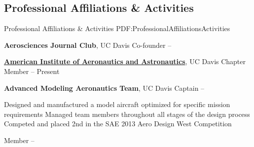 \documentclass[letterpaper,MMMyyyy,nonstop]{simpleresumecv}
\begin{document}
\begin{body}





\section
{Professional Affiliations\newline
\& Activities}
{Professional Affiliations \& Activities}
{PDF:ProfessionalAffiliationsActivities}

\textbf{Aerosciences Journal Club},
UC Davis
\GapNoBreak
\BulletItem
Co-founder
\hfill
{} --


\href{https://www.aiaa.org/}
{\textbf{American Institute of Aeronautics and Astronautics}},
UC Davis Chapter
\GapNoBreak
\BulletItem
Member
\hfill
{} --
Present


\textbf{Advanced Modeling Aeronautics Team},
UC Davis
\GapNoBreak
\BulletItem
Captain
\hfill
{} --
\begin{detail}
\SubBulletItem
Designed and manufactured a model aircraft optimized for specific mission requirements
\SubBulletItem
Managed team members throughout all stages of the design process
\SubBulletItem
Competed and placed 2nd in the SAE 2013 Aero Design West Competition
\end{detail}
\GapNoBreak
\BulletItem
Member
\hfill
 --




\end{body}
\end{document}
